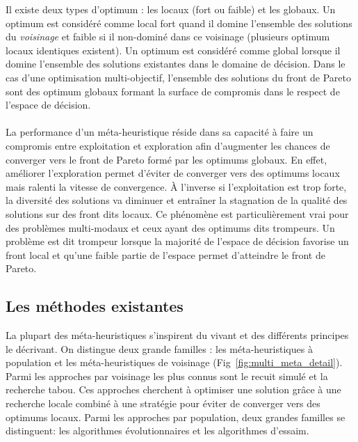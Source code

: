 \begin{Def}\label{def:optimum}
Il existe deux types d’optimum : les locaux (fort ou faible) et les globaux.
Un optimum est considéré comme local fort quand il domine l’ensemble des solutions
du \emph{voisinage} et faible si il non-dominé dans ce voisinage (plusieurs
optimum locaux identiques existent). Un optimum est considéré comme global lorsque il domine
l’ensemble des solutions existantes dans le domaine de décision. Dans le cas d’une
optimisation multi-objectif, l’ensemble des solutions du front de Pareto sont des
optimum globaux formant la surface de compromis dans le respect de l’espace de
décision.
\end{Def}

\paragraph{} %
La performance d’un méta-heuristique réside dans sa capacité à faire
un compromis entre exploitation et exploration afin d’augmenter les chances de
converger vers le front de Pareto formé par les optimums globaux.
En effet, améliorer l’exploration permet d’éviter de converger vers des optimums
locaux mais ralenti la vitesse de convergence. À l’inverse si l’exploitation est
trop forte, la diversité des solutions va diminuer et entraîner la stagnation de
la qualité des solutions sur des front dits locaux. Ce phénomène est particulièrement
vrai pour des problèmes multi-modaux et ceux ayant des optimums dits trompeurs.
Un problème est dit trompeur lorsque la majorité de l’espace de décision favorise
un front local et qu’une faible partie de l’espace permet d’atteindre le front de
Pareto.


\subsection{Les méthodes existantes} %
\label{sub:les_methodes_existantes}
La plupart des méta-heuristiques s’inspirent du vivant et des différents principes
le décrivant. On distingue deux grande familles : les méta-heuristiques à population
et les méta-heuristiques de voisinage (Fig~\ref{fig:multi_meta_detail}). Parmi
les approches par voisinage les plus connus sont le recuit simulé et la recherche tabou.
Ces approches cherchent à optimiser une solution grâce à une recherche locale combiné
à une stratégie pour éviter de converger vers des optimums locaux.
Parmi les approches par population, deux grandes familles se distinguent: les algorithmes
évolutionnaires et les algorithmes d’essaim.

